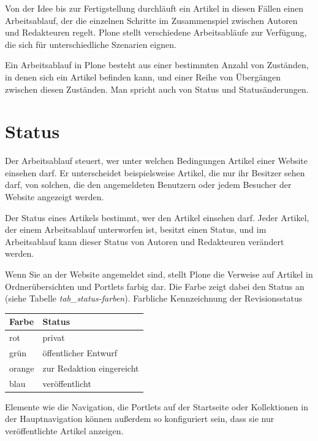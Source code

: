 \documentclass[a4paper,12pt,ngerman]{manual}
\begin{document}
Von der Idee bis zur Fertigstellung durchläuft ein Artikel in diesen Fällen
einen Arbeitsablauf, der die einzelnen Schritte im Zusammenspiel zwischen
Autoren und Redakteuren regelt. Plone stellt verschiedene Arbeitsabläufe zur
Verfügung, die sich für unterschiedliche Szenarien eignen.

Ein Arbeitsablauf in Plone besteht aus einer bestimmten Anzahl von Zuständen,
in denen sich ein Artikel befinden kann, und einer Reihe von Übergängen
zwischen diesen Zuständen. Man spricht auch von Status und Statusänderungen.


\section{Status}

Der Arbeitsablauf steuert, wer unter welchen Bedingungen Artikel einer
Website einsehen darf. Er unterscheidet beispielsweise Artikel, die
nur ihr Besitzer sehen darf, von solchen, die den angemeldeten
Benutzern oder jedem Besucher der Website angezeigt werden.

Der Status eines Artikels bestimmt, wer den Artikel einsehen
darf. Jeder Artikel, der einem Arbeitsablauf unterworfen ist, besitzt
einen Status, und im Arbeitsablauf kann dieser Status von Autoren und
Redakteuren verändert werden.

Wenn Sie an der Website angemeldet sind, stellt Plone die Verweise auf
Artikel in Ordnerübersichten und Portlets farbig dar. Die Farbe zeigt
dabei den Status an (siehe Tabelle \emph{tab\_status-farben}).
\hypertarget{tab-status-farben}{}
Farbliche Kennzeichnung der Revisionsstatus

\begin{tabulary}{\textwidth}{|L|L|}
\hline
\textbf{
Farbe
} & \textbf{
Status
}\\
\hline

rot
 & 
privat
\\

grün
 & 
öffentlicher Entwurf
\\

orange
 & 
zur Redaktion eingereicht
\\

blau
 & 
veröffentlicht
\\
\hline
\end{tabulary}


Elemente wie die Navigation, die Portlets auf der Startseite oder
Kollektionen in der Hauptnavigation können außerdem so konfiguriert
sein, dass sie nur veröffentlichte Artikel anzeigen.
\end{document}
